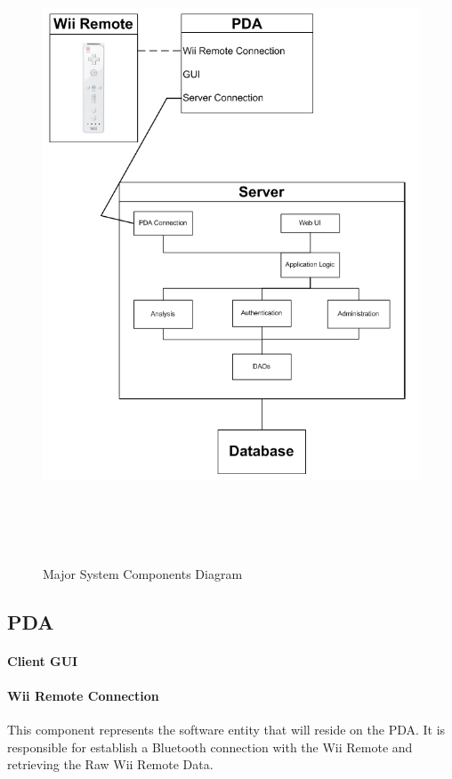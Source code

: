 \documentclass{article}
\begin{document}
\begin{figure}[p]
\includegraphics[width=6in,height=7.44in]{major_system_components.png}
\caption{Major System Components Diagram}
\label{fig: Major System Components}
\end{figure}

\subsection{PDA}

\paragraph{Client GUI}

\paragraph{Wii Remote Connection}
This component represents the software entity that will reside on the PDA. It is responsible for establish a Bluetooth connection with the Wii Remote and retrieving the Raw Wii Remote Data.
\end{document}
